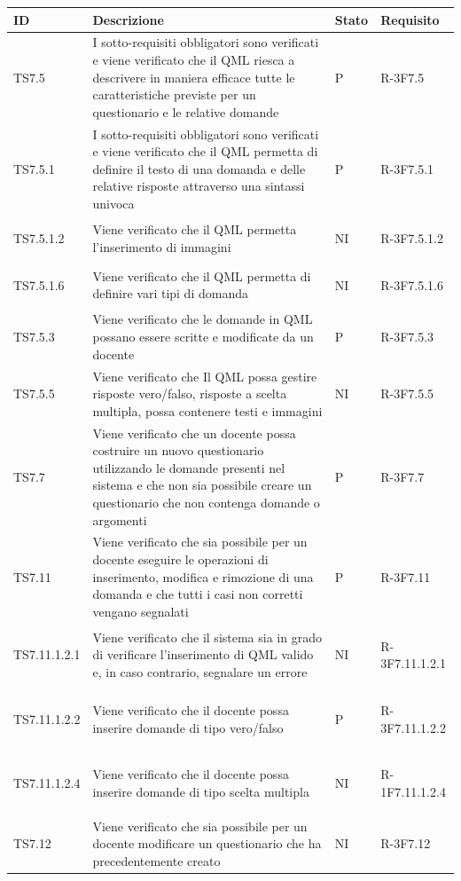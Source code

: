 \documentclass[12pt,a4paper]{article}
\begin{document}
\begin{longtable}{l p{10cm} l l}
\midrule
\textbf{ID} & \textbf{Descrizione} & \textbf{Stato} & \textbf{Requisito} \tabularnewline
\midrule
		TS7.5 & I sotto-requisiti obbligatori sono verificati e viene verificato che il QML riesca a descrivere in maniera efficace tutte le caratteristiche previste per un questionario e le relative domande & P& \hypertarget{R-3F7.5}{R-3F7.5}\tabularnewline
		\midrule
		TS7.5.1 & I sotto-requisiti obbligatori sono verificati e viene verificato che il QML permetta di definire il testo di una domanda e delle relative risposte attraverso una sintassi univoca & P& \hypertarget{R-3F7.5.1}{R-3F7.5.1}\tabularnewline
		\midrule
		TS7.5.1.2 & Viene verificato che il QML permetta l'inserimento di immagini & NI & \hypertarget{R-3F7.5.1.2}{R-3F7.5.1.2}\tabularnewline
		\midrule
		TS7.5.1.6 & Viene verificato che il QML permetta di definire vari tipi di domanda & NI & \hypertarget{R-3F7.5.1.6}{R-3F7.5.1.6}\tabularnewline
		\midrule
		TS7.5.3 & Viene verificato che le domande in QML possano essere scritte e modificate da un docente & P& \hypertarget{R-3F7.5.3}{R-3F7.5.3}\tabularnewline
		\midrule
		TS7.5.5 & Viene verificato che Il QML possa gestire risposte vero/falso, risposte a scelta multipla, possa contenere testi e immagini	 & NI & \hypertarget{R-3F7.5.5}{R-3F7.5.5}\tabularnewline
		\midrule
		TS7.7 & Viene verificato che un docente possa costruire un nuovo questionario utilizzando le domande presenti nel sistema e che non sia possibile creare un questionario che non contenga domande o argomenti
		& P& \hypertarget{R-3F7.7}{R-3F7.7}\tabularnewline
		\midrule
		TS7.11 & Viene verificato che sia possibile per un docente eseguire le operazioni di inserimento, modifica e rimozione di una domanda e che tutti i casi non corretti vengano segnalati & P& \hypertarget{R-3F7.11}{R-3F7.11}\tabularnewline
		\midrule
		TS7.11.1.2.1 & Viene verificato che il sistema sia in grado di verificare l'inserimento di QML valido e, in caso contrario, segnalare un errore & NI & \hypertarget{R-3F7.11.1.2.1}{R-3F7.11.1.2.1}\tabularnewline
		\midrule
		TS7.11.1.2.2 & Viene verificato che il docente possa inserire domande di tipo vero/falso	 & P& \hypertarget{R-3F7.11.1.2.2}{R-3F7.11.1.2.2}\tabularnewline
		\midrule
		TS7.11.1.2.4 & Viene verificato che il docente possa inserire domande di tipo scelta multipla & NI & \hypertarget{R-1F7.11.1.2.4}{R-1F7.11.1.2.4}\tabularnewline
		\midrule
		TS7.12 & Viene verificato che sia possibile per un docente modificare un questionario che ha precedentemente creato & NI & \hypertarget{R-3F7.12}{R-3F7.12}\tabularnewline

\end{longtable}
\end{document}
